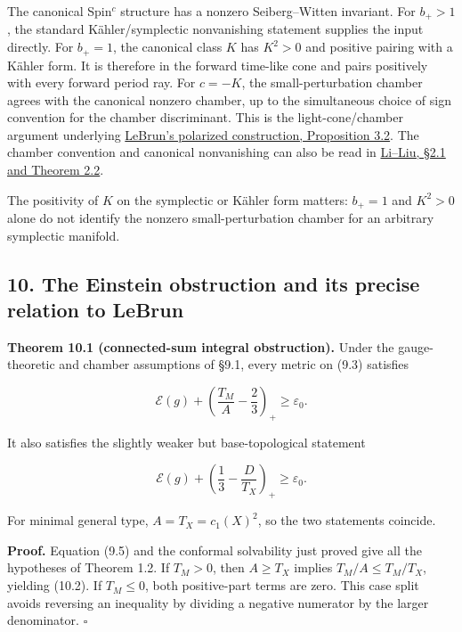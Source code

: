 \documentclass[
  10pt,
]{article}
\begin{document}
The canonical Spin\(^c\) structure has a nonzero Seiberg--Witten
invariant. For \(b_+>1\), the standard Kähler/symplectic nonvanishing
statement supplies the input directly. For \(b_+=1\), the canonical
class \(K\) has \(K^2>0\) and positive pairing with a Kähler form. It is
therefore in the forward time-like cone and pairs positively with every
forward period ray. For \(c=-K\), the small-perturbation chamber agrees
with the canonical nonzero chamber, up to the simultaneous choice of
sign convention for the chamber discriminant. This is the
light-cone/chamber argument underlying
\href{https://arxiv.org/pdf/math/0003068}{LeBrun's polarized
construction, Proposition 3.2}. The chamber convention and canonical
nonvanishing can also be read in
\href{https://arxiv.org/pdf/math/0012048}{Li--Liu, §2.1 and Theorem
2.2}.

The positivity of \(K\) on the symplectic or Kähler form matters:
\(b_+=1\) and \(K^2>0\) alone do not identify the nonzero
small-perturbation chamber for an arbitrary symplectic manifold.

\hypertarget{the-einstein-obstruction-and-its-precise-relation-to-lebrun}{%
\subsection{10. The Einstein obstruction and its precise relation to
LeBrun}\label{the-einstein-obstruction-and-its-precise-relation-to-lebrun}}

\textbf{Theorem 10.1 (connected-sum integral obstruction).} Under the
gauge-theoretic and chamber assumptions of §9.1, every metric on (9.3)
satisfies

\[
 \mathcal E(g)+\left(\frac{T_M}{A}-\frac23\right)_+
                         \ge\varepsilon_0.               \tag{10.1}
\]

It also satisfies the slightly weaker but base-topological statement

\[
 \boxed{\displaystyle
 \mathcal E(g)+\left(\frac13-\frac{D}{T_X}\right)_+
                         \ge\varepsilon_0.}              \tag{10.2}
\]

For minimal general type, \(A=T_X=c_1(X)^2\), so the two statements
coincide.

\textbf{Proof.} Equation (9.5) and the conformal solvability just proved
give all the hypotheses of Theorem 1.2. If \(T_M>0\), then \(A\ge T_X\)
implies \(T_M/A\le T_M/T_X\), yielding (10.2). If \(T_M\le0\), both
positive-part terms are zero. This case split avoids reversing an
inequality by dividing a negative numerator by the larger denominator.
\(\square\)
\end{document}
